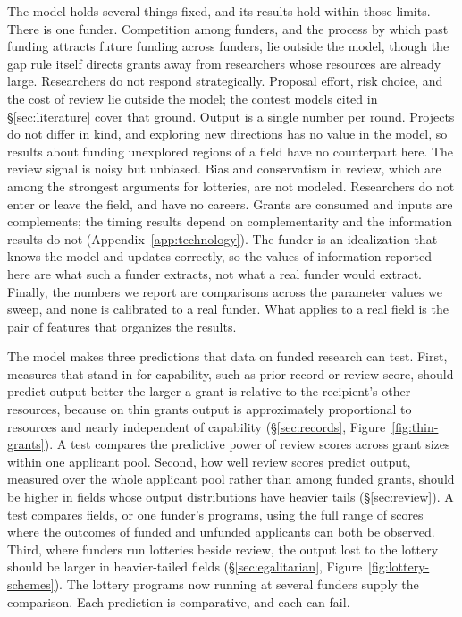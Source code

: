 \documentclass[article, 11pt, reqno]{amsart}
\theoremstyle{named}
\begin{document}
The model holds several things fixed, and its results hold within those limits. There is one funder. Competition among funders, and the process by which past funding attracts future funding across funders, lie outside the model, though the gap rule itself directs grants away from researchers whose resources are already large. Researchers do not respond strategically. Proposal effort, risk choice, and the cost of review lie outside the model; the contest models cited in \S\ref{sec:literature} cover that ground. Output is a single number per round. Projects do not differ in kind, and exploring new directions has no value in the model, so results about funding unexplored regions of a field have no counterpart here. The review signal is noisy but unbiased. Bias and conservatism in review, which are among the strongest arguments for lotteries, are not modeled. Researchers do not enter or leave the field, and have no careers. Grants are consumed and inputs are complements; the timing results depend on complementarity and the information results do not (Appendix~\ref{app:technology}). The funder is an idealization that knows the model and updates correctly, so the values of information reported here are what such a funder extracts, not what a real funder would extract. Finally, the numbers we report are comparisons across the parameter values we sweep, and none is calibrated to a real funder. What applies to a real field is the pair of features that organizes the results.

The model makes three predictions that data on funded research can test. First, measures that stand in for capability, such as prior record or review score, should predict output better the larger a grant is relative to the recipient's other resources, because on thin grants output is approximately proportional to resources and nearly independent of capability (\S\ref{sec:records}, Figure~\ref{fig:thin-grants}). A test compares the predictive power of review scores across grant sizes within one applicant pool. Second, how well review scores predict output, measured over the whole applicant pool rather than among funded grants, should be higher in fields whose output distributions have heavier tails (\S\ref{sec:review}). A test compares fields, or one funder's programs, using the full range of scores where the outcomes of funded and unfunded applicants can both be observed. Third, where funders run lotteries beside review, the output lost to the lottery should be larger in heavier-tailed fields (\S\ref{sec:egalitarian}, Figure~\ref{fig:lottery-schemes}). The lottery programs now running at several funders supply the comparison. Each prediction is comparative, and each can fail.
\end{document}
